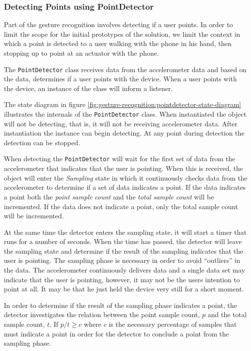 \subsubsection{Detecting Points using PointDetector}

Part of the gesture recognition involves detecting if a user points. In order to limit the scope for the initial prototypes of the solution, we limit the context in which a point is detected to a user walking with the phone in his hand, then stopping up to point at an actuator with the phone.

The \texttt{PointDetector} class receives data from the accelerometer data and based on the data, determines if a user points with the device. When a user points with the device, an instance of the class will inform a listener.

The state diagram in figure \ref{fig:gesture-recognition:pointdetector-state-diagram} illustrates the internals of the \texttt{PointDetector} class. When instantiated the object will not be detecting, that is, it will not be receiving accelerometer data. After instantiation the instance can begin detecting. At any point during detection the detection can be stopped.

When detecting the \texttt{PointDetector} will wait for the first set of data from the accelerometer that indicates that the user is pointing. When this is received, the object will enter the \textit{Sampling} state in which it continuously checks data from the accelerometer to determine if a set of data indicates a point. If the data indicates a point both the \textit{point sample count} and the \textit{total sample count} will be incremented. If the data does not indicate a point, only the total sample count will be incremented.

At the same time the detector enters the sampling state, it will start a timer that runs for a number of seconds. When the time has passed, the detector will leave the sampling state and determine if the result of the sampling indicates that the user is pointing. The sampling phase is necessary in order to avoid ``outliers'' in the data. The accelerometer continuously delivers data and a single data set may indicate that the user is pointing, however, it may not be the users intention to point at all. It may be that he just held the device very still for a short moment.

In order to determine if the result of the sampling phase indicates a point, the detector investigates the relation between the point sample count, $p$ and the total sample count, $t$. If $p/t \geq c$ where $c$ is the necessary percentage of samples that must indicate a point in order for the detector to conclude a point from the sampling phase.

